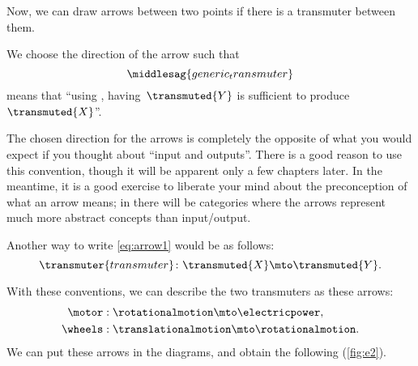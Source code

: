 Now, we can draw arrows between two points if there is a transmuter between them.

We choose the direction of the arrow such that
%
\begin{equation}
    \label{eq:arrow1}
    \middlesag{generic_transmuter}
\end{equation}
means that ``using , having~$\transmuted{Y}$ is sufficient to produce~$\transmuted{X}$''.

\begin{remark}
    The chosen direction for the arrows is completely the opposite of what you would expect if you thought about ``input and outputs''.
    There is a good reason to use this convention, though it will be apparent only a few chapters later.
    In the meantime, it is a good exercise to liberate your mind about the preconception of what an arrow means; in  there will be categories where the arrows represent much more abstract concepts than input/output.
\end{remark}

Another way to write \cref{eq:arrow1} would be as follows:
\begin{equation}
    \transmuter{transmuter} \colon \transmuted{X} \mto \transmuted{Y}.
\end{equation}

With these conventions, we can describe the two transmuters as these arrows:
%
\begin{equation}
    \label{eq:transmutation_example}
    \begin{aligned}
        \motor  & :  \rotationalmotion \mto \electricpower, \\
        \wheels & : \translationalmotion \mto \rotationalmotion.
    \end{aligned}
\end{equation}
%
We can put these arrows in the diagrams, and obtain the following (\cref{fig:e2}).




